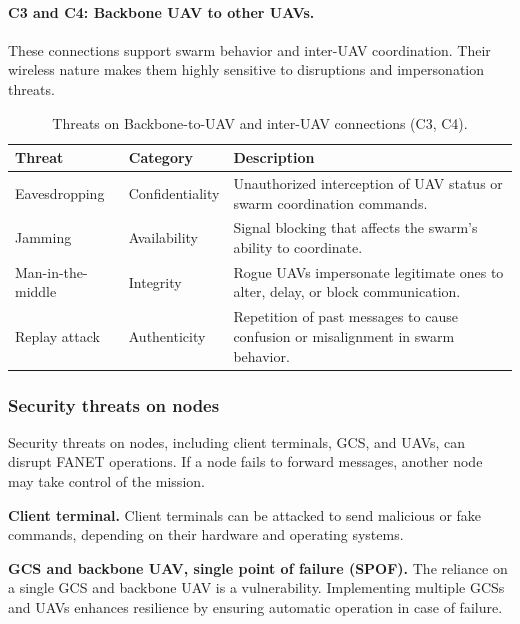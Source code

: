 \paragraph{C3 and C4: Backbone UAV to other UAVs.}

These connections support swarm behavior and inter-UAV coordination. Their wireless nature makes them highly sensitive to disruptions and impersonation threats.

\begin{table}[H]
\renewcommand{\arraystretch}{1.3}
\centering
\caption{Threats on Backbone-to-UAV and inter-UAV connections (C3, C4).}
\begin{tabular}{|>{\centering\arraybackslash}m{3.5cm}|
                >{\centering\arraybackslash}m{2.5cm}|
                >{\arraybackslash}m{7.5cm}|}
\hline
\textbf{Threat} & \textbf{Category} & \textbf{Description} \\
\hline
Eavesdropping & Confidentiality & Unauthorized interception of UAV status or swarm coordination commands. \\
\hline
Jamming & Availability & Signal blocking that affects the swarm’s ability to coordinate. \\
\hline
Man-in-the-middle & Integrity & Rogue UAVs impersonate legitimate ones to alter, delay, or block communication. \\
\hline
Replay attack & Authenticity & Repetition of past messages to cause confusion or misalignment in swarm behavior. \\
\hline
\end{tabular}
\label{tab:c3_c4_threats}
\end{table}






\subsubsection{Security threats on nodes}

Security threats on nodes, including client terminals, GCS, and UAVs, can disrupt FANET operations. If a node fails to forward messages, another node may take control of the mission.

\textbf{Client terminal.} Client terminals can be attacked to send malicious or fake commands, depending on their hardware and operating systems.

\textbf{GCS and backbone UAV, single point of failure (SPOF).} The reliance on a single GCS and backbone UAV is a vulnerability. Implementing multiple GCSs and UAVs enhances resilience by ensuring automatic operation in case of failure.

